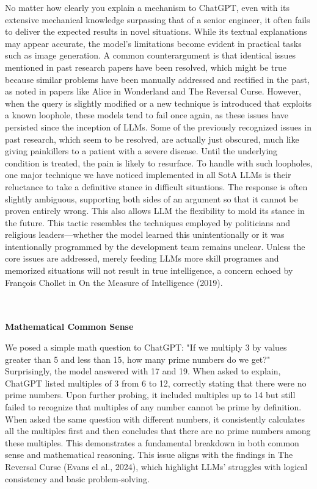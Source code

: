 \documentclass[11pt]{scrartcl}
\begin{document}
No matter how clearly you explain a mechanism to ChatGPT, even with its extensive mechanical knowledge surpassing that of a senior engineer, it often fails to deliver the expected results in novel situations. While its textual explanations may appear accurate, the model's limitations become evident in practical tasks such as image generation. A common counterargument is that identical issues mentioned in past research papers have been resolved, which might be true because similar problems have been manually addressed and rectified in the past, as noted in papers like Alice in Wonderland\cite{ref2} and The Reversal Curse\cite{ref1}. However, when the query is slightly modified or a new technique is introduced that exploits a known loophole, these models tend to fail once again, as these issues have persisted since the inception of LLMs. Some of the previously recognized issues in past research, which seem to be resolved, are actually just obscured, much like giving painkillers to a patient with a severe disease. Until the underlying condition is treated, the pain is likely to resurface. To handle with such loopholes, one major technique we have noticed implemented in all SotA LLMs is their reluctance to take a definitive stance in difficult situations. The response is often slightly ambiguous, supporting both sides of an argument so that it cannot be proven entirely wrong. This also allows LLM the flexibility to mold its stance in the future. This tactic resembles the techniques employed by politicians and religious leaders—whether the model learned this unintentionally or it was intentionally programmed by the development team remains unclear. Unless the core issues are addressed, merely feeding LLMs more skill programes and memorized situations will not result in true intelligence, a concern echoed by François Chollet in On the Measure of Intelligence (2019)\cite{ref3}. \\ \\ \\ 

\begin{huge}
\textbf{Mathematical Common Sense}
\end{huge}
We posed a simple math question to ChatGPT: "If we multiply 3 by values greater than 5 and less than 15, how many prime numbers do we get?" Surprisingly, the model answered with 17 and 19. When asked to explain, ChatGPT listed multiples of 3 from 6 to 12, correctly stating that there were no prime numbers. Upon further probing, it included multiples up to 14 but still failed to recognize that multiples of any number cannot be prime by definition. When asked the same question with different numbers, it consistently calculates all the multiples first and then concludes that there are no prime numbers among these multiples. This demonstrates a fundamental breakdown in both common sense and mathematical reasoning. This issue aligns with the findings in The Reversal Curse (Evans el al., 2024)\cite{ref1}, which highlight LLMs' struggles with logical consistency and basic problem-solving.
\end{document}
